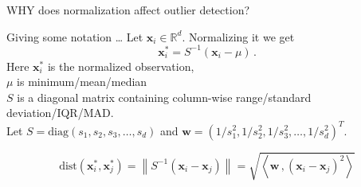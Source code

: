 \documentclass{beamer}
\newcommand{\dist}{\text{dist}}
\newcommand{\diag}{\text{diag}}
\begin{document}
\begin{darkframes}
\begin{frame}{WHY does normalization affect outlier detection?}
\begin{itemize}
	\end{itemize}
	\end{frame}

	\begin{frame}{Giving some notation \ldots }
	Let  $\mathbf{x}_i \in \mathbb{R}^d$. Normalizing it we get 
	\begin{equation*}\label{eq:norm1}
	\mathbf{x}^*_i = S^{-1}\left(\mathbf{x}_i - \mu \right) \, .
	\end{equation*}
	Here $\mathbf{x}^*_i$ is the normalized observation,  \\
	$\mu$ is minimum/mean/median  \\
	$S$ is a diagonal matrix containing column-wise range/standard deviation/IQR/MAD. \\
	 Let $S = \diag(s_1, s_2, s_3, \dots, s_d)$ and $\mathbf{w} = (1/s_1^2, 1/s_2^2, 1/s_3^2, \dots, 1/s_d^2)^T$. %
	
	\begin{equation*}\label{eq:norm2}
	\dist(\mathbf{x}^*_i, \mathbf{x}^*_j) = \left\lVert S^{-1}\left(\mathbf{x}_i - \mathbf{x}_j \right) \right\rVert = \sqrt{ \left\langle \mathbf{w}\, , \left(\mathbf{x}_i - \mathbf{x}_j \right)^2 \right\rangle }
	\end{equation*}
	\end{frame}	

\end{darkframes}
\end{document}

